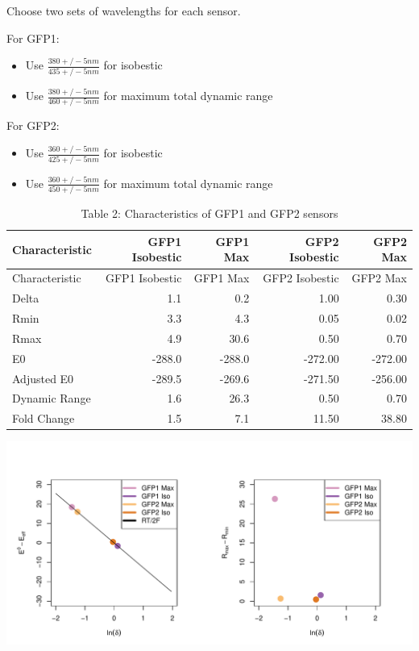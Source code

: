 \documentclass[]{article}
\providecommand{\tightlist}{%
  \setlength{\itemsep}{0pt}\setlength{\parskip}{0pt}}
\begin{document}
Choose two sets of wavelengths for each sensor.

For GFP1:

\begin{itemize}
\tightlist
\item
  Use \(\frac{380 +/- 5 nm}{435 +/- 5 nm}\) for isobestic
\item
  Use \(\frac{380 +/- 5 nm}{460 +/- 5 nm}\) for maximum total dynamic
  range
\end{itemize}

For GFP2:

\begin{itemize}
\tightlist
\item
  Use \(\frac{360 +/- 5 nm}{425 +/- 5 nm}\) for isobestic
\item
  Use \(\frac{360 +/- 5 nm}{450 +/- 5 nm}\) for maximum total dynamic
  range
\end{itemize}

\begin{longtable}[]{@{}lrrrr@{}}
\caption{Table 2: Characteristics of GFP1 and GFP2
sensors}\tabularnewline
\toprule
Characteristic & GFP1 Isobestic & GFP1 Max & GFP2 Isobestic & GFP2
Max\tabularnewline
\midrule
\endfirsthead
\toprule
Characteristic & GFP1 Isobestic & GFP1 Max & GFP2 Isobestic & GFP2
Max\tabularnewline
\midrule
\endhead
Delta & 1.1 & 0.2 & 1.00 & 0.30\tabularnewline
Rmin & 3.3 & 4.3 & 0.05 & 0.02\tabularnewline
Rmax & 4.9 & 30.6 & 0.50 & 0.70\tabularnewline
E0 & -288.0 & -288.0 & -272.00 & -272.00\tabularnewline
Adjusted E0 & -289.5 & -269.6 & -271.50 & -256.00\tabularnewline
Dynamic Range & 1.6 & 26.3 & 0.50 & 0.70\tabularnewline
Fold Change & 1.5 & 7.1 & 11.50 & 38.80\tabularnewline
\bottomrule
\end{longtable}

\begin{center}\includegraphics{Comparison_roGFP1_roGFP2_files/figure-latex/Characterize E0 and delta-1} \end{center}
\end{document}
